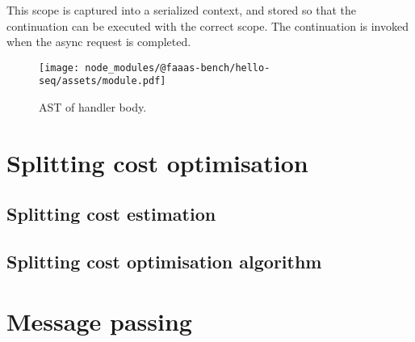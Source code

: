 This scope is captured into a serialized context, and stored so that the continuation can be executed with the correct scope. The continuation is invoked when the async request is completed.

\begin{figure}[t]
    \texttt{[image: node\_modules/@faaas-bench/hello-seq/assets/module.pdf]}
    \caption{AST of handler body.}
    \label{fig:suites-hello-seq-module-ast}
\end{figure}

\section{Splitting cost optimisation}

\subsection{Splitting cost estimation}

\subsection{Splitting cost optimisation algorithm}

\section{Message passing}
